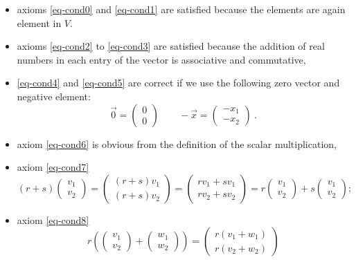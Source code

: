 \documentclass[
  letterpaper,
  DIV=11,
  numbers=noendperiod]{scrartcl}
\providecommand{\tightlist}{%
  \setlength{\itemsep}{0pt}\setlength{\parskip}{0pt}}
\theoremstyle{remark}
\begin{document}
\begin{itemize}
\tightlist
\item
  axioms \ref{eq-cond0} and \ref{eq-cond1} are satisfied because the
  elements are again element in \(V\).
\item
  axioms \ref{eq-cond2} to \ref{eq-cond3} are satisfied because the
  addition of real numbers in each entry of the vector is associative
  and commutative,
\item
  \ref{eq-cond4} and \ref{eq-cond5} are correct if we use the following
  zero vector and negative element:
  \[\vec{0}=\scriptstyle \begin{pmatrix}   0\\0  \end{pmatrix} \textstyle \qquad   -\vec{x} = \scriptstyle \begin{pmatrix}   -x_{1}\\-x_{2}  \end{pmatrix} \textstyle \ .\]
\item
  axiom \ref{eq-cond6} is obvious from the definition of the scalar
  multiplication,
\item
  axiom \ref{eq-cond7}
  \[(r+s) \begin{pmatrix}   v_1 \\ v_2  \end{pmatrix} 
    =\begin{pmatrix}   (r+s)v_1 \\ (r+s)v_2  \end{pmatrix} 
    = \begin{pmatrix}   rv_1+sv_1 \\ rv_2+sv_2  \end{pmatrix} 
    =r \begin{pmatrix}   v_1 \\ v_2  \end{pmatrix} +s \begin{pmatrix}   v_1 \\ v_2  \end{pmatrix}; \]
\item
  axiom \ref{eq-cond8}
  \[r \left( \begin{pmatrix}   v_1 \\ v_2  \end{pmatrix} + \begin{pmatrix}   w_1 \\ w_2  \end{pmatrix} \right)
    =\begin{pmatrix}   r(v_1+w_1) \\ r(v_2+w_2)  \end{pmatrix} 
\]
\end{itemize}
\end{document}
